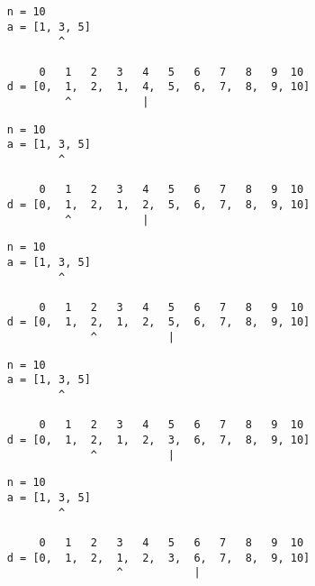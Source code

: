 \begin{frame}[fragile]
\begin{verbatim}
     n = 10
     a = [1, 3, 5]
             ^

          0   1   2   3   4   5   6   7   8   9  10
     d = [0,  1,  2,  1,  4,  5,  6,  7,  8,  9, 10]
              ^           |
\end{verbatim}
\end{frame}
\addtocounter{framenumber}{-1}

\begin{frame}[fragile]
\begin{verbatim}
     n = 10
     a = [1, 3, 5]
             ^

          0   1   2   3   4   5   6   7   8   9  10
     d = [0,  1,  2,  1,  2,  5,  6,  7,  8,  9, 10]
              ^           |
\end{verbatim}
\end{frame}
\addtocounter{framenumber}{-1}

\begin{frame}[fragile]
\begin{verbatim}
     n = 10
     a = [1, 3, 5]
             ^

          0   1   2   3   4   5   6   7   8   9  10
     d = [0,  1,  2,  1,  2,  5,  6,  7,  8,  9, 10]
                  ^           |
\end{verbatim}
\end{frame}
\addtocounter{framenumber}{-1}

\begin{frame}[fragile]
\begin{verbatim}
     n = 10
     a = [1, 3, 5]
             ^

          0   1   2   3   4   5   6   7   8   9  10
     d = [0,  1,  2,  1,  2,  3,  6,  7,  8,  9, 10]
                  ^           |
\end{verbatim}
\end{frame}
\addtocounter{framenumber}{-1}

\begin{frame}[fragile]
\begin{verbatim}
     n = 10
     a = [1, 3, 5]
             ^

          0   1   2   3   4   5   6   7   8   9  10
     d = [0,  1,  2,  1,  2,  3,  6,  7,  8,  9, 10]
                      ^           |
\end{verbatim}
\end{frame}
\addtocounter{framenumber}{-1}

